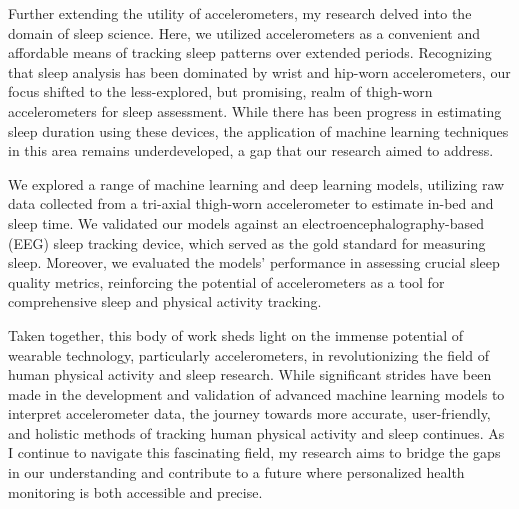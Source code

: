 \documentclass[
  8pt,
  letterpaper,
  DIV=11,
  numbers=noendperiod]{scrartcl}
\begin{document}
Further extending the utility of accelerometers, my research delved into
the domain of sleep science. Here, we utilized accelerometers as a
convenient and affordable means of tracking sleep patterns over extended
periods. Recognizing that sleep analysis has been dominated by wrist and
hip-worn accelerometers, our focus shifted to the less-explored, but
promising, realm of thigh-worn accelerometers for sleep assessment.
While there has been progress in estimating sleep duration using these
devices, the application of machine learning techniques in this area
remains underdeveloped, a gap that our research aimed to address.

We explored a range of machine learning and deep learning models,
utilizing raw data collected from a tri-axial thigh-worn accelerometer
to estimate in-bed and sleep time. We validated our models against an
electroencephalography-based (EEG) sleep tracking device, which served
as the gold standard for measuring sleep. Moreover, we evaluated the
models' performance in assessing crucial sleep quality metrics,
reinforcing the potential of accelerometers as a tool for comprehensive
sleep and physical activity tracking.

Taken together, this body of work sheds light on the immense potential
of wearable technology, particularly accelerometers, in revolutionizing
the field of human physical activity and sleep research. While
significant strides have been made in the development and validation of
advanced machine learning models to interpret accelerometer data, the
journey towards more accurate, user-friendly, and holistic methods of
tracking human physical activity and sleep continues. As I continue to
navigate this fascinating field, my research aims to bridge the gaps in
our understanding and contribute to a future where personalized health
monitoring is both accessible and precise.

\newpage


\printbibliography[title=References]
\end{document}

